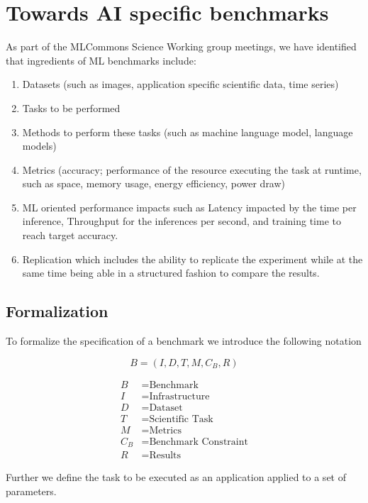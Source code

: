 \section{Towards AI specific benchmarks}
\label{sec:towards}


As part of the MLCommons Science Working group meetings, we have identified that ingredients of ML benchmarks include:

\begin{enumerate}
\item Datasets (such as images, application specific scientific data, time series)
\item Tasks to be performed 
\item Methods to perform these tasks (such as machine language model, language models)
\item Metrics (accuracy; performance of the resource executing the task at runtime, such as  
  space, 
  memory usage, 
  energy efficiency, 
  power draw)
\item ML oriented performance impacts such as Latency impacted by the time per inference, Throughput for the  inferences per second, 
and training time to reach target accuracy.

\item Replication which includes the ability to replicate the experiment while at the same time being able in a structured fashion to compare the results.
\end{enumerate}

\subsection{Formalization}
\label{subsec:towards-formal}

To formalize the specification of a benchmark we introduce the following notation

\[  B = (I, D, T, M, C_B, R) \]

\[
\begin{array}{ll}
B & = \text{Benchmark} \\
I & = \text{Infrastructure} \\
D & = \text{Dataset} \\
T & = \text{Scientific Task} \\
M & = \text{Metrics} \\
C_B & = \text{Benchmark Constraint} \\
R & = \text{Results}
\end{array}
\]

Further we define the task to be executed as an application applied to a set of parameters.

